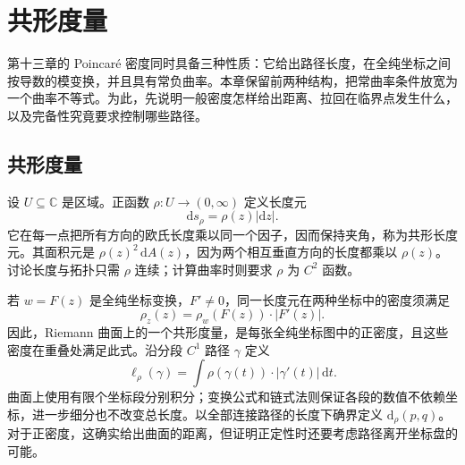 \section{共形度量}
\label{b3:sec:1401}

第十三章的 Poincaré 密度同时具备三种性质：它给出路径长度，在全纯坐标之间按导数的模变换，并且具有常负曲率。本章保留前两种结构，把常曲率条件放宽为一个曲率不等式。为此，先说明一般密度怎样给出距离、拉回在临界点发生什么，以及完备性究竟要求控制哪些路径。

\subsection{共形度量}
\label{b3:subsec:140101}

设 \(U\subseteq\mathbb C\) 是区域。正函数 \(\rho:U\to(0,\infty)\) 定义长度元
\[
 \mathrm ds_\rho=\rho(z)|\mathrm dz|.
\]
它在每一点把所有方向的欧氏长度乘以同一个因子，因而保持夹角，称为共形长度元。其面积元是 \(\rho(z)^2\,\mathrm dA(z)\)，因为两个相互垂直方向的长度都乘以 \(\rho(z)\)。讨论长度与拓扑只需 \(\rho\) 连续；计算曲率时则要求 \(\rho\) 为 \(C^2\) 函数。

\ProseParagraphBreak
若 \(w=F(z)\) 是全纯坐标变换，\(F'\ne0\)，同一长度元在两种坐标中的密度须满足
\[
 \rho_z(z)=\rho_w(F(z))\cdot|F'(z)|.
\]
因此，Riemann 曲面上的一个共形度量，是每张全纯坐标图中的正密度，且这些密度在重叠处满足此式。沿分段 \(C^1\) 路径 \(\gamma\) 定义
\[
 \ell_\rho(\gamma)=\int\rho(\gamma(t))\cdot|\gamma'(t)|\,\mathrm dt.
\]
曲面上使用有限个坐标段分别积分；变换公式和链式法则保证各段的数值不依赖坐标，进一步细分也不改变总长度。以全部连接路径的长度下确界定义 \(\mathrm d_\rho(p,q)\)。对于正密度，这确实给出曲面的距离，但证明正定性时还要考虑路径离开坐标盘的可能。

